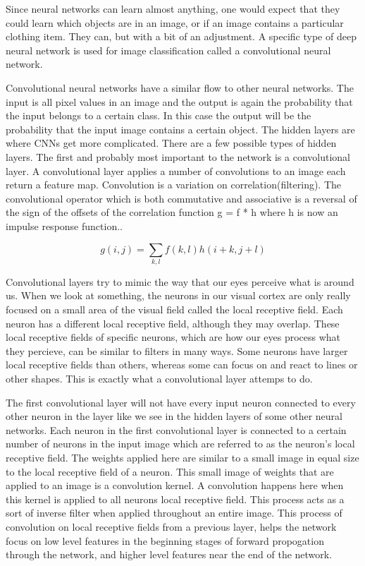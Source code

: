 \documentclass[12pt]{article} %
\begin{document}
	Since neural networks can learn almost anything, one would expect that they could learn which objects are in an image, or if an image contains a particular clothing item. They can, but with a bit of an adjustment. A specific type of deep neural network is used for image classification called a convolutional neural network. 

	Convolutional neural networks have a similar flow to other neural networks. The input is all pixel values in an image and the output is again the probability that the input belongs to a certain class. In this case the output will be the probability that the input image contains a certain object. The hidden layers are where CNNs get more complicated. There are a few possible types of hidden layers. The first and probably most important to the network is a convolutional layer. A convolutional layer applies a number of convolutions to an image each return a feature map\cite{aurelienMachineLearning}. Convolution is a variation on correlation(filtering). The convolutional operator which is both commutative and associative is a reversal of the sign of the offsets of the correlation function  g = f * h where h is now an impulse response function.\cite{szeliski2010computer}. 

\[g(i,j) = \sum_{k,l} f(k, l)h(i + k, j + l)\]

	Convolutional layers try to mimic the way that our eyes perceive what is around us. When we look at something, the neurons in our visual cortex are only really focused on a small area of the visual field called the local receptive field. Each neuron has a different local receptive field, although they may overlap. These local receptive fields of specific neurons, which are how our eyes process what they percieve, can be similar to filters in many ways. Some neurons have larger local receptive fields than others, whereas some can focus on and react to lines or other shapes. This is exactly what a convolutional layer attemps to do.\cite{aurelienMachineLearning} 
	
	The first convolutional layer will not have every input neuron connected to every other neuron in the layer like we see in the hidden layers of some other neural networks. Each neuron in the first convolutional layer is connected to a certain number of neurons in the input image which are referred to as the neuron's local receptive field. The weights applied here are similar to a small image in equal size to the local receptive field of a neuron. This small image of weights that are applied to an image is a convolution kernel. A convolution happens here when this kernel is applied to all neurons local receptive field. This process acts as a sort of inverse filter when applied throughout an entire image. This process of convolution on local receptive fields from a previous layer, helps the network focus on low level features in the beginning stages of forward propogation through the network, and higher level features near the end of the network.\cite{aurelienMachineLearning} 
	
\end{document}

